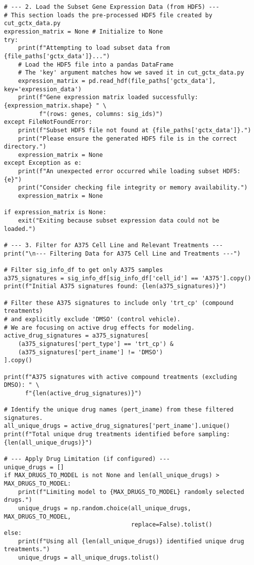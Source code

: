 \documentclass[12pt]{article}
\begin{document}
\begin{lstlisting}[caption={Python Analysis Script}]
# --- 2. Load the Subset Gene Expression Data (from HDF5) ---
# This section loads the pre-processed HDF5 file created by cut_gctx_data.py
expression_matrix = None # Initialize to None
try:
    print(f"Attempting to load subset data from {file_paths['gctx_data']}...")
    # Load the HDF5 file into a pandas DataFrame
    # The 'key' argument matches how we saved it in cut_gctx_data.py
    expression_matrix = pd.read_hdf(file_paths['gctx_data'], key='expression_data')
    print(f"Gene expression matrix loaded successfully: {expression_matrix.shape} " \
          f"(rows: genes, columns: sig_ids)")
except FileNotFoundError:
    print(f"Subset HDF5 file not found at {file_paths['gctx_data']}.")
    print("Please ensure the generated HDF5 file is in the correct directory.")
    expression_matrix = None
except Exception as e:
    print(f"An unexpected error occurred while loading subset HDF5: {e}")
    print("Consider checking file integrity or memory availability.")
    expression_matrix = None

if expression_matrix is None:
    exit("Exiting because subset expression data could not be loaded.")

# --- 3. Filter for A375 Cell Line and Relevant Treatments ---
print("\n--- Filtering Data for A375 Cell Line and Treatments ---")

# Filter sig_info_df to get only A375 samples
a375_signatures = sig_info_df[sig_info_df['cell_id'] == 'A375'].copy()
print(f"Initial A375 signatures found: {len(a375_signatures)}")

# Filter these A375 signatures to include only 'trt_cp' (compound treatments)
# and explicitly exclude 'DMSO' (control vehicle).
# We are focusing on active drug effects for modeling.
active_drug_signatures = a375_signatures[
    (a375_signatures['pert_type'] == 'trt_cp') &
    (a375_signatures['pert_iname'] != 'DMSO')
].copy()

print(f"A375 signatures with active compound treatments (excluding DMSO): " \
      f"{len(active_drug_signatures)}")

# Identify the unique drug names (pert_iname) from these filtered signatures.
all_unique_drugs = active_drug_signatures['pert_iname'].unique()
print(f"Total unique drug treatments identified before sampling: {len(all_unique_drugs)}")

# --- Apply Drug Limitation (if configured) ---
unique_drugs = []
if MAX_DRUGS_TO_MODEL is not None and len(all_unique_drugs) > MAX_DRUGS_TO_MODEL:
    print(f"Limiting model to {MAX_DRUGS_TO_MODEL} randomly selected drugs.")
    unique_drugs = np.random.choice(all_unique_drugs, MAX_DRUGS_TO_MODEL, 
                                    replace=False).tolist()
else:
    print(f"Using all {len(all_unique_drugs)} identified unique drug treatments.")
    unique_drugs = all_unique_drugs.tolist()


\end{lstlisting}
\end{document}

